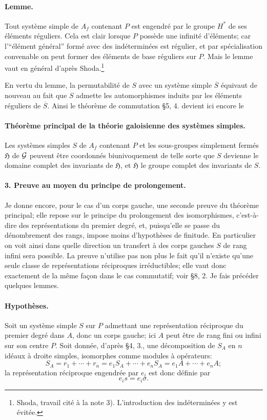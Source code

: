 \paragraph{Lemme.}
Tout système simple de \(A_f\) contenant \(P\) est engendré par le groupe \(H^*\) de ses éléments réguliers. Cela est clair lorsque \(P\) possède une infinité d'éléments; car l'``élément général'' formé avec des indéterminées est régulier, et par spécialisation convenable on peut former des éléments de base réguliers sur \(P\). Mais le lemme vaut en général d'après Shoda.\footnote{Shoda, travail cité à la note 3). L'introduction des indéterminées y est évitée.}

En vertu du lemme, la permutabilité de \(S\) avec un système simple \(\overline S\) équivaut de nouveau au fait que \(S\) admette les automorphismes induits par les éléments réguliers de \(\overline S\). Ainsi le théorème de commutation \S 5, 4. devient ici encore le

\paragraph{Théorème principal de la théorie galoisienne des systèmes simples.}
Les systèmes simples \(S\) de \(A_f\) contenant \(P\) et les sous-groupes simplement fermés \(\mathfrak H\) de \(\mathcal G\) peuvent être coordonnés biunivoquement de telle sorte que \(S\) devienne le domaine complet des invariants de \(\mathfrak H\), et \(\mathfrak H\) le groupe complet des invariants de \(S\).

\paragraph{3. Preuve au moyen du principe de prolongement.}
Je donne encore, pour le cas d'un corps gauche, une seconde preuve du théorème principal; elle repose sur le principe du prolongement des isomorphismes, c'est-à-dire des représentations du premier degré, et, puisqu'elle se passe du dénombrement des rangs, impose moins d'hypothèses de finitude. En particulier on voit ainsi dans quelle direction un transfert à des corps gauches \(S\) de rang infini sera possible. La preuve n'utilise pas non plus le fait qu'il n'existe qu'une seule classe de représentations réciproques irréductibles; elle vaut donc exactement de la même façon dans le cas commutatif; voir \S 8, 2. Je fais précéder quelques lemmes.

\paragraph{Hypothèses.}
Soit un système simple \(S\) sur \(P\) admettant une représentation réciproque du premier degré dans \(A\), donc un corps gauche; ici \(A\) peut être de rang fini ou infini sur son centre \(P\). Soit donnée, d'après \S 4, 3., une décomposition de \(S_A\) en \(n\) idéaux à droite simples, isomorphes comme modules à opérateurs:
\[
        S_A=r_1+\cdots+r_n
            =e_1S_A+\cdots+e_nS_A
            =e_1A+\cdots+e_nA ;
\]
la représentation réciproque engendrée par \(e_i\) est donc définie par
\[
        e_i s=e_i\sigma .
\]

